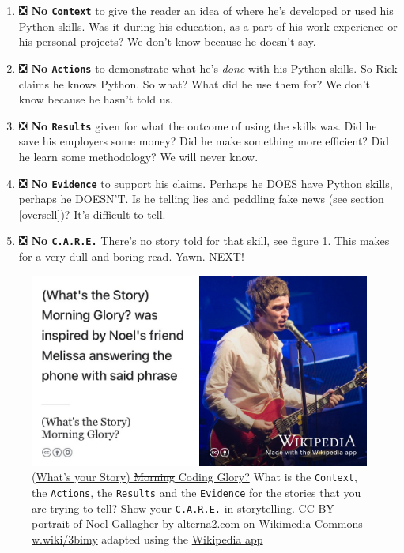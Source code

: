 \documentclass[
]{book}
\providecommand{\tightlist}{%
  \setlength{\itemsep}{0pt}\setlength{\parskip}{0pt}}
\begin{document}
\begin{enumerate}
\def\labelenumi{\arabic{enumi}.}
\tightlist
\item
  ❎ \textbf{No \texttt{Context}} to give the reader an idea of where he's developed or used his Python skills. Was it during his education, as a part of his work experience or his personal projects? We don't know because he doesn't say.\\
\item
  ❎ \textbf{No \texttt{Actions}} to demonstrate what he's \emph{done} with his Python skills. So Rick claims he knows Python. So what? What did he use them for? We don't know because he hasn't told us.
\item
  ❎ \textbf{No \texttt{Results}} given for what the outcome of using the skills was. Did he save his employers some money? Did he make something more efficient? Did he learn some methodology? We will never know.\\
\item
  ❎ \textbf{No \texttt{Evidence}} to support his claims. Perhaps he DOES have Python skills, perhaps he DOESN'T. Is he telling lies and peddling fake news (see section \ref{oversell})? It's difficult to tell.
\item
  ❎ \textbf{No \texttt{C.A.R.E.}} There's no story told for that skill, see figure \ref{fig:gallagher-fig}. This makes for a very dull and boring read. Yawn. NEXT! 🥱
\end{enumerate}

\begin{figure}

{\centering \includegraphics[width=1\linewidth]{images/whats-the-story} 

}

\caption{\href{https://en.wikipedia.org/wiki/(What\%27s_the_Story)_Morning_Glory\%3F}{(What's your Story) \sout{Morning} Coding Glory?} \citep{whatsthestory} What is the \texttt{Context}, the \texttt{Actions}, the \texttt{Results} and the \texttt{Evidence} for the stories that you are trying to tell? Show your \texttt{C.A.R.E.} in storytelling. CC BY portrait of \href{https://en.wikipedia.org/wiki/Noel_Gallagher}{Noel Gallagher} by \href{https://alterna2.com/}{alterna2.com} on Wikimedia Commons \href{https://w.wiki/3bim}{w.wiki/3bimy} adapted using the \href{https://apps.apple.com/us/app/wikipedia/id324715238}{Wikipedia app}}\label{fig:gallagher-fig}
\end{figure}
\end{document}
